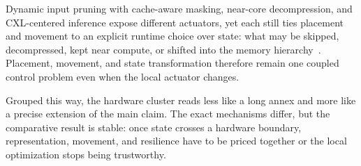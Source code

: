 Dynamic input pruning with cache-aware masking, near-core decompression, and CXL-centered inference expose different actuators, yet each still ties placement and movement to an explicit runtime choice over state: what may be skipped, decompressed, kept near compute, or shifted into the memory hierarchy~\cite{federici2025dip,gerogiannis2025deca,gu2025cent}. Placement, movement, and state transformation therefore remain one coupled control problem even when the local actuator changes.

Grouped this way, the hardware cluster reads less like a long annex and more like a precise extension of the main claim. The exact mechanisms differ, but the comparative result is stable: once state crosses a hardware boundary, representation, movement, and resilience have to be priced together or the local optimization stops being trustworthy.
